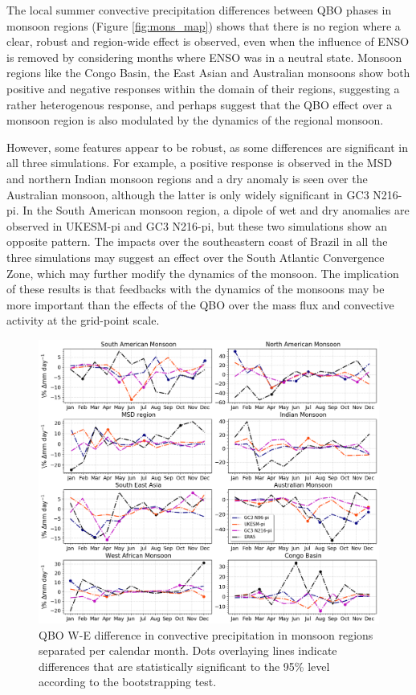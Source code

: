 The local summer convective precipitation differences between QBO phases in monsoon regions (Figure \ref{fig:mons_map}) shows that there is no region where a clear, robust and region-wide effect is observed, even when the influence of ENSO is removed by considering months where ENSO was in a neutral state. Monsoon regions like the Congo Basin, the East Asian and Australian monsoons show both positive and negative responses within the domain of their regions, suggesting a rather heterogenous response, and perhaps suggest that the QBO effect over a monsoon region is also modulated by the dynamics of the regional monsoon. 




However, some features appear to be robust, as some differences are significant in all three simulations. For example, a positive response is observed in the MSD and northern Indian monsoon regions and a dry anomaly is seen over the Australian monsoon, although the latter is only widely significant in GC3 N216-pi. 
In the South American monsoon region, a dipole of wet and dry anomalies are observed in UKESM-pi and GC3 N216-pi, but these two simulations show an opposite pattern. 
The impacts over the southeastern coast of Brazil in all the three simulations may suggest an effect over the South Atlantic Convergence Zone, which may further modify the dynamics of the monsoon. 
The implication of these results is that feedbacks with the dynamics of the monsoons may be more important than the effects of the QBO over the mass flux and convective activity at the grid-point scale. 

\begin{figure}[t!]
\centering
 \includegraphics[width=\linewidth]{figures/mons_init_conv_prcompari.png}
\caption[Impacts of the QBO in the seasonal cycle of monsoon regions.]{QBO W-E difference in convective precipitation in monsoon regions separated per calendar month. Dots overlaying lines indicate differences that are statistically significant to the 95\% level according to the bootstrapping test.}
\label{fig:mons_convpr}
\end{figure}

